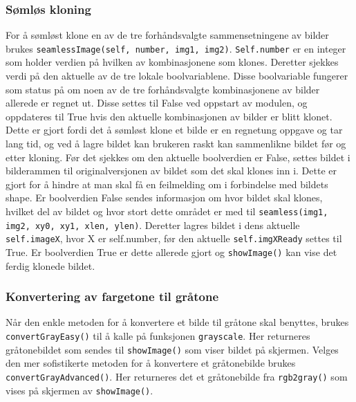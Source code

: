 \subsubsection{Sømløs kloning}
For å sømløst klone en av de tre forhåndsvalgte sammensetningene av bilder brukes \newline\texttt{seamlessImage(self, number, img1, img2)}.
\texttt{Self.number} er en integer som holder verdien på hvilken av kombinasjonene som klones. Deretter sjekkes verdi på den aktuelle av de tre lokale boolvariablene. Disse boolvariable fungerer som status på om noen av de tre forhåndsvalgte kombinasjonene av bilder allerede er regnet ut. Disse settes til False ved oppstart av modulen, og oppdateres til True hvis den aktuelle kombinasjonen av bilder er blitt klonet. Dette er gjort fordi det å sømløst klone et bilde er en regnetung oppgave og tar lang tid, og ved å lagre bildet kan brukeren raskt kan sammenlikne bildet før og etter kloning. Før det sjekkes om den aktuelle boolverdien er False, settes bildet i bilderammen til originalversjonen av bildet som det skal klones inn i. Dette er gjort for å hindre at man skal få en feilmelding om i forbindelse med bildets shape. Er boolverdien False sendes informasjon om hvor bildet skal klones, hvilket del av bildet og hvor stort dette området er med til \texttt{seamless(img1, img2, xy0, xy1, xlen, ylen)}. Deretter lagres bildet i dens aktuelle \texttt{self.imageX}, hvor X er self.number, før den aktuelle \texttt{self.imgXReady} settes til True. Er boolverdien True er dette allerede gjort og \texttt{showImage()} kan vise det ferdig klonede bildet. 

\subsubsection{Konvertering av fargetone til gråtone}
Når den enkle metoden for å konvertere et bilde til gråtone skal benyttes, brukes \texttt{convertGrayEasy()} til å kalle på funksjonen \texttt{grayscale}. Her returneres gråtonebildet som sendes til \texttt{showImage()} som viser bildet på skjermen. Velges den mer sofistikerte metoden for å konvertere et gråtonebilde brukes \texttt{convertGrayAdvanced()}. Her returneres det et gråtonebilde fra \texttt{rgb2gray()} som vises på skjermen av \texttt{showImage()}.

